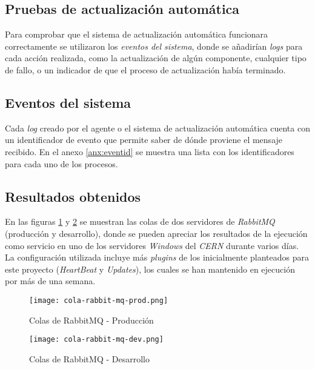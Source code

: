     \subsection{Pruebas de actualización automática}
        Para comprobar que el sistema de actualización automática funcionara correctamente se utilizaron los \textit{eventos del sistema}, donde se añadirían \textit{logs} para cada acción realizada, como la actualización de algún componente, cualquier tipo de fallo, o un indicador de que el proceso de actualización había terminado.
        
    \subsection{Eventos del sistema}
        Cada \textit{log} creado por el agente o el sistema de actualización automática cuenta con un identificador de evento que permite saber de dónde proviene el mensaje recibido. En el anexo \ref{anx:eventid} se muestra una lista con los identificadores para cada uno de los procesos.
        
    \subsection{Resultados obtenidos}
        En las figuras \ref{fig:rabbitmq-prod-queue} y \ref{fig:rabbitmq-dev-queue} se muestran las colas de dos servidores de \textit{RabbitMQ} (producción y desarrollo), donde se pueden apreciar los resultados de la ejecución como servicio en uno de los servidores \textit{Windows} del \textit{CERN} durante varios días. La configuración utilizada incluye más \textit{plugins} de los inicialmente planteados para este proyecto (\textit{HeartBeat} y \textit{Updates}), los cuales se han mantenido en ejecución por más de una semana.
        
        \begin{figure}[h!]
        \centering
            \texttt{[image: cola-rabbit-mq-prod.png]}
            \caption{Colas de RabbitMQ - Producción}
            \label{fig:rabbitmq-prod-queue}
        \end{figure}
    
        \begin{figure}[h!]
        \centering
            \texttt{[image: cola-rabbit-mq-dev.png]}
            \caption{Colas de RabbitMQ - Desarrollo}
            \label{fig:rabbitmq-dev-queue}
        \end{figure}
        
